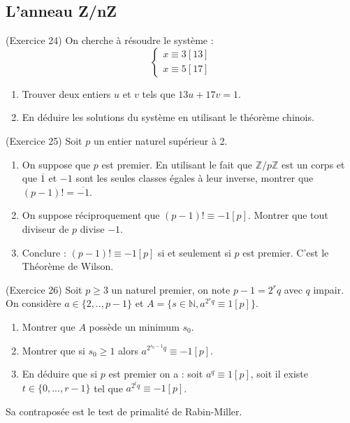 \subsection{L'anneau Z/nZ}

\begin{exercice}
(Exercice 24)
On cherche à résoudre le système :
$$ \begin{cases}x\equiv3[13]\\ x\equiv5[17]\end{cases} $$ 
\begin{enumerate}
 \item[a)] Trouver deux entiers $u$ et $v$ tels que $13u+17v=1$. 
 \item[b)] En déduire les solutions du système en utilisant le théorème chinois. 
\end{enumerate}
\end{exercice}

\begin{exercice}
(Exercice 25)
Soit $p$ un entier naturel supérieur à 2. 
\begin{enumerate}
 \item[a)] On suppose que $p$ est premier. En utilisant le fait que $\mathbb{Z}/p\mathbb{Z}$ est un corps et que $\overline{1}$ et $-1$ sont les seules classes égales à leur inverse, montrer que $(p-1)!=\overline{-1}$. 
 \item[b)] On suppose réciproquement que $(p-1)!\equiv-1[p]$. Montrer que tout diviseur de $p$ divise $-1$. 
 \item[c)] Conclure : $(p-1)!\equiv-1[p]$ si et seulement si $p$ est premier. C'est le Théorème de Wilson. 
\end{enumerate}
\end{exercice}

\begin{exercice}
(Exercice 26)
Soit $p\ge3$ un naturel premier, on note $p-1=2^{r}q$ avec $q$ impair. 
On considère $a\in\{2,..,p-1\}$ et $A=\{s\in\mathbb{N}, a^{2^{s}q}\equiv1[p]\}$. 
\begin{enumerate}
 \item Montrer que $A$ possède un minimum $s_{0}$. 
 \item Montrer que si $s_{0}\ge1$ alors $a^{2^{s_{0}-1}q}\equiv-1[p]$. 
 \item En déduire que si $p$ est premier on a : soit $a^{q}\equiv1[p]$, soit il existe $t\in\{0,...,r-1\}$ tel que $a^{2^{t}q}\equiv-1[p]$. 
\end{enumerate}
Sa contraposée est le test de primalité de Rabin-Miller. 
\end{exercice}

